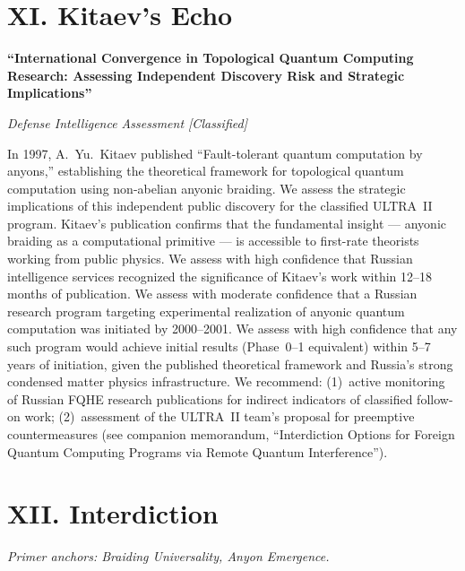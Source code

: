 \section*{XI. Kitaev's Echo}
\label{appendix:kitaevs-echo}

\textbf{``International Convergence in Topological Quantum Computing Research: Assessing Independent Discovery Risk and Strategic Implications''}

\textit{Defense Intelligence Assessment [Classified]}

\vspace{0.3cm}

In 1997, A.~Yu.\ Kitaev published ``Fault-tolerant quantum computation by anyons,'' establishing the theoretical framework for topological quantum computation using non-abelian anyonic braiding. We assess the strategic implications of this independent public discovery for the classified ULTRA~II program. Kitaev's publication confirms that the fundamental insight --- anyonic braiding as a computational primitive --- is accessible to first-rate theorists working from public physics. We assess with high confidence that Russian intelligence services recognized the significance of Kitaev's work within 12--18 months of publication. We assess with moderate confidence that a Russian research program targeting experimental realization of anyonic quantum computation was initiated by 2000--2001. We assess with high confidence that any such program would achieve initial results (Phase~0--1 equivalent) within 5--7 years of initiation, given the published theoretical framework and Russia's strong condensed matter physics infrastructure. We recommend: (1)~active monitoring of Russian FQHE research publications for indirect indicators of classified follow-on work; (2)~assessment of the ULTRA~II team's proposal for preemptive countermeasures (see companion memorandum, ``Interdiction Options for Foreign Quantum Computing Programs via Remote Quantum Interference'').

\vspace{1cm}

\section*{XII. Interdiction}
\label{appendix:interdiction}

\noindent\textit{Primer anchors: Braiding Universality, Anyon Emergence.}

